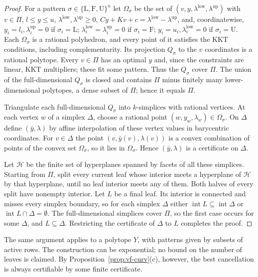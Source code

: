\begin{proof}
For a pattern $\sigma\in\{\mathrm L,\mathrm F,\mathrm U\}^n$ let $\Omega_\sigma$
be the set of $(v,y,\lambda^{\mathrm{low}},\lambda^{\mathrm{up}})$ with $v\in\Pi$,
$l\le y\le u$, $\lambda^{\mathrm{low}},\lambda^{\mathrm{up}}\ge0$,
$Cy+Kv+c=\lambda^{\mathrm{low}}-\lambda^{\mathrm{up}}$, and, coordinatewise,
$y_i=l_i,\lambda^{\mathrm{up}}_i=0$ if $\sigma_i=\mathrm L$;
$\lambda^{\mathrm{low}}_i=\lambda^{\mathrm{up}}_i=0$ if $\sigma_i=\mathrm F$;
$y_i=u_i,\lambda^{\mathrm{low}}_i=0$ if $\sigma_i=\mathrm U$. Each $\Omega_\sigma$
is a rational polyhedron, and every point of it satisfies the KKT conditions,
including complementarity. Its projection $Q_\sigma$ to the $v$ coordinates
is a rational polytope. Every $v\in\Pi$ has an optimal $y$ and, since the
constraints are linear, KKT multipliers; these fit some pattern. Thus the
$Q_\sigma$ cover $\Pi$. The union of the full-dimensional $Q_\sigma$ is closed
and contains $\Pi$ minus finitely many lower-dimensional polytopes, a dense
subset of $\Pi$; hence it equals $\Pi$.

Triangulate each full-dimensional $Q_\sigma$ into $k$-simplices with rational
vertices. At each vertex $w$ of a simplex $\Delta$, choose a rational point
$(w,y_w,\lambda_w)\in\Omega_\sigma$. On $\Delta$ define $(\bar y,\lambda)$ by
affine interpolation of these vertex values in barycentric coordinates. For
$v\in\Delta$ the point $(v,\bar y(v),\lambda(v))$ is a convex combination of
points of the convex set $\Omega_\sigma$, so it lies in $\Omega_\sigma$. Hence
$(\bar y,\lambda)$ is a certificate on $\Delta$.

Let $\mathcal H$ be the finite set of hyperplanes spanned by facets of all
these simplices. Starting from $\Pi$, split every current leaf whose interior
meets a hyperplane of $\mathcal H$ by that hyperplane, until no leaf interior
meets any of them. Both halves of every split have nonempty interior. Let $L$
be a final leaf. Its interior is connected and misses every simplex boundary,
so for each simplex $\Delta$ either $\operatorname{int}L\subseteq\operatorname{int}\Delta$
or $\operatorname{int}L\cap\Delta=\emptyset$. The full-dimensional simplices
cover $\Pi$, so the first case occurs for some $\Delta$, and $L\subseteq\Delta$.
Restricting the certificate of $\Delta$ to $L$ completes the proof.
\end{proof}

The same argument applies to a polytope $Y$, with patterns given by subsets
of active rows. The construction can be exponential; no bound on the number
of leaves is claimed. By Proposition~\ref{prop:vf-curv}(c), however, the
best cancellation is always certifiable by some finite certificate.

